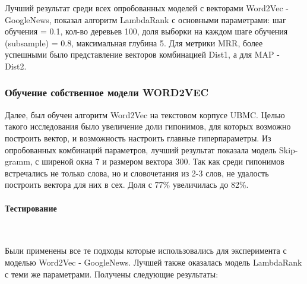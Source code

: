 Лучший результат среди всех опробованных моделей с векторами Word2Vec - GoogleNews,
показал алгоритм LambdaRank с основными параметрами: шаг обучения = 0.1, кол-во
деревьев 100, доля выборки на каждом шаге обучения (subsample) = 0.8, максимальная
глубина 5. Для метрики MRR, более успешными было представление векторов
комбинацией Dist1, а для MAP - Dist2.

\subsubsection{Обучение собственное модели WORD2VEC}

Далее, был обучен алгоритм Word2Vec на текстовом корпусе UBMC. Целью такого
исследования было увеличение доли гипонимов, для которых возможно построить вектор,
и возможность настроить главные гиперпараметры.
Из опробованных комбинаций параметров, лучший результат показала модель Skip-gramm,
с ширеной окна 7 и размером вектора 300.
Так как среди гипонимов встречались не только слова, но и словочетания из 2-3 слов, не
удалость построить вектора для них в сех. Доля с 77\% увеличилась до 82\%.

\paragraph{Тестирование}
~\
~\

Были применены все те подходы которые использовались для эксперимента с моделью
Word2Vec - GoogleNews.
Лучшей также оказалась модель LambdaRank с теми же параметрами.
Получены следующие результаты:

